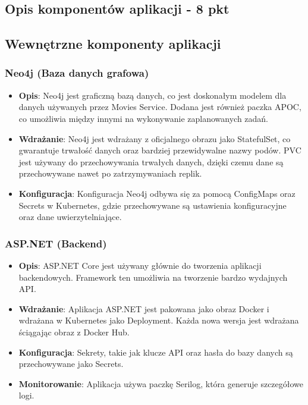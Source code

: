 \documentclass[12pt,a4paper]{article}
\begin{document}
\subsection{Opis komponentów aplikacji - 8 pkt}
\label{sec:FunctionalConditions}

\subsection{Wewnętrzne komponenty aplikacji}

\subsubsection{Neo4j (Baza danych grafowa)}
\begin{itemize}
    \item \textbf{Opis}: Neo4j jest graficzną bazą danych, co jest doskonałym modelem dla danych używanych przez Movies Service. Dodana jest również paczka APOC, co umożliwia między innymi na wykonywanie zaplanowanych zadań.
    \item \textbf{Wdrażanie}: Neo4j jest wdrażany z oficjalnego obrazu jako StatefulSet, co gwarantuje trwałość danych oraz bardziej przewidywalne nazwy podów. PVC jest używany do przechowywania trwałych danych, dzięki czemu dane są przechowywane nawet po zatrzymywaniach replik.
    \item \textbf{Konfiguracja}: Konfiguracja Neo4j odbywa się za pomocą ConfigMaps oraz Secrets w Kubernetes, gdzie przechowywane są ustawienia konfiguracyjne oraz dane uwierzytelniające.
\end{itemize}

\subsubsection{ASP.NET (Backend)}
\begin{itemize}
    \item \textbf{Opis}: ASP.NET Core jest używany głównie do tworzenia aplikacji backendowych. Framework ten umożliwia na tworzenie bardzo wydajnych API.
    \item \textbf{Wdrażanie}: Aplikacja ASP.NET jest pakowana jako obraz Docker i wdrażana w Kubernetes jako Deployment. Każda nowa wersja jest wdrażana ściągając obraz z Docker Hub.
    \item \textbf{Konfiguracja}: Sekrety, takie jak klucze API oraz hasła do bazy danych są przechowywane jako Secrets.
    \item \textbf{Monitorowanie}: Aplikacja używa paczkę Serilog, która generuje szczegółowe logi.
\end{itemize}
\end{document}
